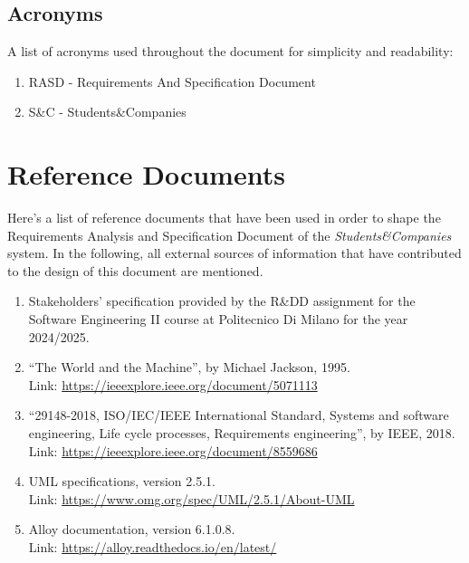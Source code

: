 \subsection{Acronyms}

A list of acronyms used throughout the document for simplicity and readability:

\begin{enumerate}
    \item RASD - Requirements And Specification Document
    \item S\&C - Students\&Companies
\end{enumerate}


\section{Reference Documents}

Here’s a list of reference documents that have been used in order to shape the Requirements Analysis and Specification Document of the \textit{Students\&Companies} system. In the following, all external sources of information that have contributed to the design of this document are mentioned.

\begin{enumerate}
    \item Stakeholders’ specification provided by the R\&DD assignment for the Software Engineering II course at Politecnico Di Milano for the year 2024/2025.
    \item ``The World and the Machine'', by Michael Jackson, 1995. \\
    Link: \url{https://ieeexplore.ieee.org/document/5071113}
    \item ``29148-2018, ISO/IEC/IEEE International Standard, Systems and software engineering, Life cycle processes, Requirements engineering'', by IEEE, 2018. \\
    Link: \url{https://ieeexplore.ieee.org/document/8559686}
    \item UML specifications, version 2.5.1. \\
    Link: \url{https://www.omg.org/spec/UML/2.5.1/About-UML}
    \item Alloy documentation, version 6.1.0.8. \\
    Link: \url{https://alloy.readthedocs.io/en/latest/}
\end{enumerate}


